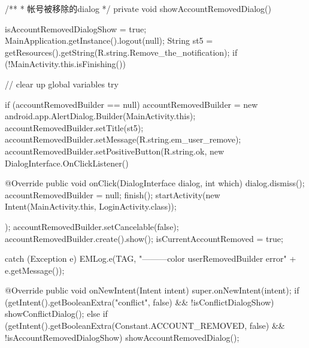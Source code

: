 {	/**
	 * 帐号被移除的dialog
	 */
	private void showAccountRemovedDialog() {
		isAccountRemovedDialogShow = true;
		MainApplication.getInstance().logout(null);
		String st5 = getResources().getString(R.string.Remove_the_notification);
		if (!MainActivity.this.isFinishing()) {
			// clear up global variables
			try {
				if (accountRemovedBuilder == null)
					accountRemovedBuilder = new android.app.AlertDialog.Builder(MainActivity.this);
				accountRemovedBuilder.setTitle(st5);
				accountRemovedBuilder.setMessage(R.string.em_user_remove);
				accountRemovedBuilder.setPositiveButton(R.string.ok, new DialogInterface.OnClickListener() {

					@Override
					public void onClick(DialogInterface dialog, int which) {
						dialog.dismiss();
						accountRemovedBuilder = null;
						finish();
						startActivity(new Intent(MainActivity.this, LoginActivity.class));
					}
				});
				accountRemovedBuilder.setCancelable(false);
				accountRemovedBuilder.create().show();
				isCurrentAccountRemoved = true;
			} catch (Exception e) {
				EMLog.e(TAG, "---------color userRemovedBuilder error" + e.getMessage());
			}

		}

	}
	@Override
	public void onNewIntent(Intent intent) {
		super.onNewIntent(intent);
		if (getIntent().getBooleanExtra("conflict", false) && !isConflictDialogShow) {
			showConflictDialog();
		} else if (getIntent().getBooleanExtra(Constant.ACCOUNT_REMOVED, false) && !isAccountRemovedDialogShow) {
			showAccountRemovedDialog();
		}
	}

}
